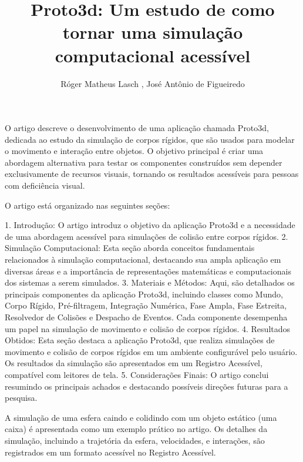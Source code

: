 \documentclass[12pt]{article}
\title{Proto3d: Um estudo de como tornar uma simulação computacional acessível}
\author{Róger Matheus Lasch \inst{1}, José Antônio de Figueiredo\inst{1}}
\begin{document}
 

\maketitle

\begin{abstract}
\end{abstract}
     
\begin{resumo} 
O artigo descreve o desenvolvimento de uma aplicação chamada Proto3d, dedicada ao estudo da simulação de corpos rígidos, que são usados para modelar o movimento e interação entre objetos. O objetivo principal é criar uma abordagem alternativa para testar os componentes construídos sem depender exclusivamente de recursos visuais, tornando os resultados acessíveis para pessoas com deficiência visual.

O artigo está organizado nas seguintes seções:

1. Introdução: O artigo introduz o objetivo da aplicação Proto3d e a necessidade de uma abordagem acessível para simulações de colisão entre corpos rígidos.
2. Simulação Computacional: Esta seção aborda conceitos fundamentais relacionados à simulação computacional, destacando sua ampla aplicação em diversas áreas e a importância de representações matemáticas e computacionais dos sistemas a serem simulados.
3. Materiais e Métodos: Aqui, são detalhados os principais componentes da aplicação Proto3d, incluindo classes como Mundo, Corpo Rígido, Pré-filtragem, Integração Numérica, Fase Ampla, Fase Estreita, Resolvedor de Colisões e Despacho de Eventos. Cada componente desempenha um papel na simulação de movimento e colisão de corpos rígidos.
4. Resultados Obtidos: Esta seção destaca a aplicação Proto3d, que realiza simulações de movimento e colisão de corpos rígidos em um ambiente configurável pelo usuário. Os resultados da simulação são apresentados em um Registro Acessível, compatível com leitores de tela.
5. Considerações Finais: O artigo conclui resumindo os principais achados e destacando possíveis direções futuras para a pesquisa.

A simulação de uma esfera caindo e colidindo com um objeto estático (uma caixa) é apresentada como um exemplo prático no artigo. Os detalhes da simulação, incluindo a trajetória da esfera, velocidades, e interações, são registrados em um formato acessível no Registro Acessível.
 
\end{resumo}
\end{document}
